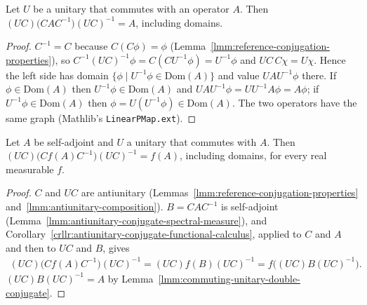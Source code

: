 \begin{lemma}
    \label{lmm:commuting-unitary-double-conjugate}
    \leanok
    Let $U$ be a unitary that commutes with an operator $A$. Then $(UC)\big(CAC^{-1}\big)(UC)^{-1} = A$, including domains.
\end{lemma}
\begin{proof}
    \leanok
    $C^{-1} = C$ because $C(C\phi) = \phi$ (Lemma~\ref{lmm:reference-conjugation-properties}), so $C^{-1}(UC)^{-1}\phi = C(CU^{-1}\phi) = U^{-1}\phi$ and $UC\,C\chi = U\chi$. Hence the left side has domain $\{ \phi \mid U^{-1}\phi \in \text{Dom}(A) \}$ and value $UAU^{-1}\phi$ there. If $\phi \in \text{Dom}(A)$ then $U^{-1}\phi \in \text{Dom}(A)$ and $UAU^{-1}\phi = UU^{-1}A\phi = A\phi$; if $U^{-1}\phi \in \text{Dom}(A)$ then $\phi = U(U^{-1}\phi) \in \text{Dom}(A)$. The two operators have the same graph (Mathlib's \texttt{LinearPMap.ext}).
\end{proof}

\begin{lemma}
    \label{lmm:unitary-conjugate-functional-calculus}
    \leanok
    Let $A$ be self-adjoint and $U$ a unitary that commutes with $A$. Then $(UC)\big(Cf(A)C^{-1}\big)(UC)^{-1} = f(A)$, including domains, for every real measurable $f$.
\end{lemma}
\begin{proof}
    \leanok
    $C$ and $UC$ are antiunitary (Lemmas~\ref{lmm:reference-conjugation-properties} and~\ref{lmm:antiunitary-composition}). $B = CAC^{-1}$ is self-adjoint (Lemma~\ref{lmm:antiunitary-conjugate-spectral-measure}), and Corollary~\ref{crllr:antiunitary-conjugate-functional-calculus}, applied to $C$ and $A$ and then to $UC$ and $B$, gives
    \begin{align}
        (UC)\big(Cf(A)C^{-1}\big)(UC)^{-1} = (UC)f(B)(UC)^{-1} = f\big((UC)B(UC)^{-1}\big).
    \end{align}
    $(UC)B(UC)^{-1} = A$ by Lemma~\ref{lmm:commuting-unitary-double-conjugate}.
\end{proof}

